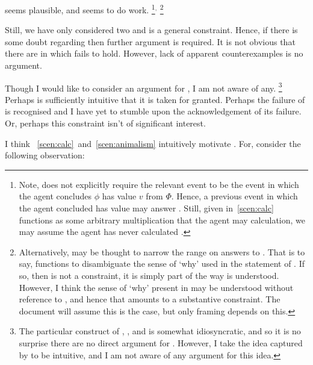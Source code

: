 \begin{note}
  \issueInclusion{} seems plausible, and seems to do work.%
  \footnote{
    Note, \qHow{} does not explicitly require the relevant event to be the event in which the agent concludes \(\phi\) has value \(v\) from \(\Phi\).
    Hence, a previous event in which the agent concluded \propM{\gistCalcEq{}} has value  may answer \qHow{}.
    Still, given \gistCalcEq{} in~\autoref{scen:calc} functions as some arbitrary multiplication that the agent may calculation, we may assume the agent has never calculated \gistCalcEq{}.
  }\(^{,}\)%
  \footnote{
    Alternatively, \issueInclusion{} may be thought to narrow the range on answers to \qWhy{}.
    That is to say, \issueInclusion{} functions to disambiguate the sense of `why' used in the statement of \qWhy{}.
    If so, then \issueInclusion{} is not a constraint, it is simply part of the way \qWhy{} is understood.
    However, I think the sense of `why' present in \qWhy{} may be understood without reference to \issueInclusion{}, and hence that \issueInclusion{} amounts to a substantive constraint.
    The document will assume this is the case, but only framing depends on this.
  }

  Still, we have only considered two  and \issueInclusion{} is a general constraint.
  Hence, if there is some doubt regarding \issueInclusion{} then further argument is required.
  It is not obvious that there are  in which \issueInclusion{} fails to hold.
  However, lack of apparent counterexamples is no argument.

  Though I would like to consider an argument for \issueInclusion{}, I am not aware of any.%
  \footnote{
    The particular construct of \qWhy{}, \qHow{}, and \issueInclusion{} is somewhat idiosyncratic, and so it is no surprise there are no direct argument for \issueInclusion{}.
    However, I take the idea captured by \issueInclusion{} to be intuitive, and I am not aware of any argument for this idea.
  }
  Perhaps \issueInclusion{} is sufficiently intuitive that it is taken for granted.
  Perhaps the failure of \issueInclusion{} is recognised and I have yet to stumble upon the acknowledgement of its failure.
  Or, perhaps this constraint isn't of significant interest.

  I think ~\ref{scen:calc}~and~\ref{scen:animalism} intuitively motivate \issueInclusion{}.
  For, consider the following observation:


\end{note}
